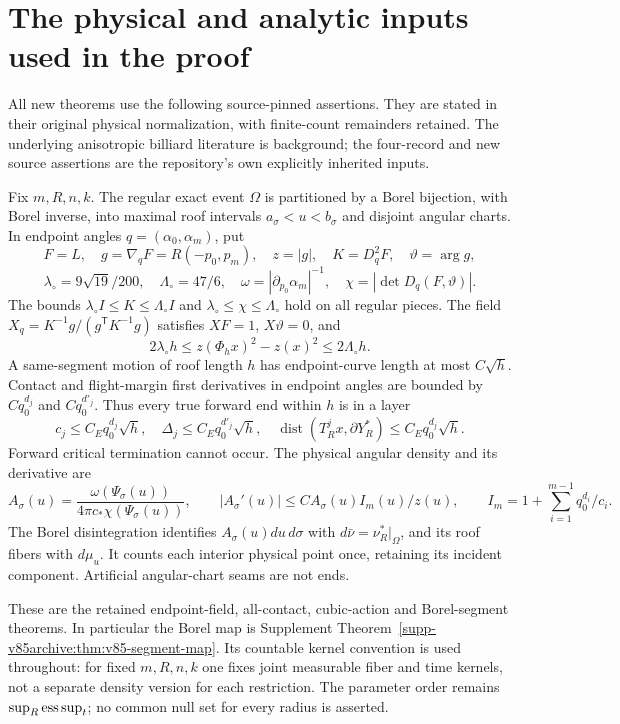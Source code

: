 \section{The physical and analytic inputs used in the proof}
\label{sec:v90-inputs}
All new theorems use the following source-pinned assertions. They are
stated in their original physical normalization, with finite-count
remainders retained. The underlying anisotropic billiard literature
\cite{DPZ} is background; the four-record and new source assertions
are the repository's own explicitly inherited inputs.

\begin{inputstatement}
\label{input:v90-geometry}
Fix $m,R,n,k$. The regular exact event $\Omega$ is partitioned by a
Borel bijection, with Borel inverse, into maximal roof intervals
$a_\sigma<u<b_\sigma$ and disjoint angular charts. In endpoint angles
$q=(\alpha_0,\alpha_m)$, put
\[
 F=L,\quad g=\nabla_qF=R(-p_0,p_m),\quad z=|g|,\quad
 K=D_q^2F,\quad\vartheta=\arg g,
\]
\[
 \lambda_\circ=9\sqrt{19}/200,\quad\Lambda_\circ=47/6,\quad
 \omega=|\partial_{p_0}\alpha_m|^{-1},\quad
 \chi=|\det D_q(F,\vartheta)|.
\]
The bounds $\lambda_\circ I\le K\le\Lambda_\circ I$ and
$\lambda_\circ\le\chi\le\Lambda_\circ$ hold on all regular pieces.
The field $X_q=K^{-1}g/(g^{\mathsf T}K^{-1}g)$ satisfies
$XF=1$, $X\vartheta=0$, and
\begin{equation}\label{eq:v83-radial-input}
 2\lambda_\circ h\le z(\Phi_hx)^2-z(x)^2\le2\Lambda_\circ h.
\end{equation}
A same-segment motion of roof length $h$ has endpoint-curve length
at most $C\sqrt h$. Contact and flight-margin first derivatives in
endpoint angles are bounded by $Cq_0^{d_j}$ and $Cq_0^{d'_j}$.
Thus every true forward end within $h$ is in a layer
\begin{equation}\label{eq:v83-layer-input}
 c_j\le C_Eq_0^{d_j}\sqrt h,\quad
 \Delta_j\le C_Eq_0^{d'_j}\sqrt h,\quad
 \operatorname{dist}(T_R^jx,\partial Y_R^*)\le C_Eq_0^{d_j}\sqrt h.
\end{equation}
Forward critical termination cannot occur. The physical angular density
and its derivative are
\[
 A_\sigma(u)=\frac{\omega(\Psi_\sigma(u))}{4\pi c_*\chi(\Psi_\sigma(u))},
 \qquad |A_\sigma'(u)|\le C A_\sigma(u)I_m(u)/z(u),\qquad
 I_m=1+\sum_{i=1}^{m-1}q_0^{d_i}/c_i.
\]
The Borel disintegration identifies $A_\sigma(u)du\,d\sigma$ with
$d\bar\nu=\nu_R^*|_\Omega$, and its roof fibers with $d\mu_u$.
It counts each interior physical point once, retaining its incident
component. Artificial angular-chart seams are not ends.
\end{inputstatement}
These are the retained endpoint-field, all-contact, cubic-action and
Borel-segment theorems. In particular the Borel map is Supplement
Theorem~\ref{supp-v85archive:thm:v85-segment-map}. Its countable
kernel convention is used throughout: for fixed $m,R,n,k$ one fixes
joint measurable fiber and time kernels, not a separate density version
for each restriction. The parameter order remains $\sup_R\operatorname*{ess\,sup}_t$;
no common null set for every radius is asserted.

